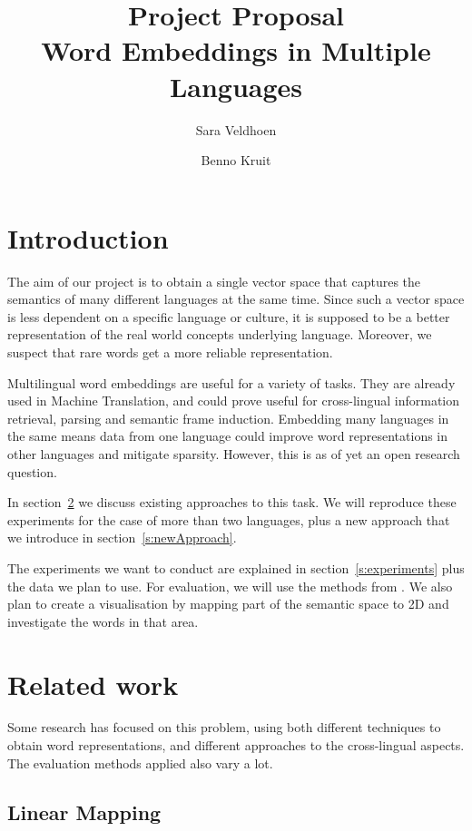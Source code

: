 \documentclass[twocolumn]{article}
\title{Project Proposal\\
Word Embeddings in Multiple Languages}
\author{Sara Veldhoen \and Benno Kruit}
\date{\vspace{-5ex}}
\begin{document}
\maketitle

\section{Introduction}
The aim of our project is to obtain a single vector space that captures the semantics of many different languages at the same time. Since such a vector space is less dependent on a specific language or culture, it is supposed to be a better representation of the real world concepts underlying language. Moreover, we suspect that rare words get a more reliable representation.

Multilingual word embeddings are useful for a variety of tasks. They are already used in Machine Translation, and could prove useful for cross-lingual information retrieval, parsing and semantic frame induction.
Embedding many languages in the same means data from one language could improve word representations in other languages and mitigate sparsity.
However, this is as of yet an open research question.


In section~\ref{s:relatedWork} we discuss existing approaches to this task. We will reproduce these experiments for the case of more than two languages, plus a new approach that we introduce in section~\ref{s:newApproach}.

The experiments we want to conduct are explained in section~\ref{s:experiments} plus the data we plan to use. For evaluation, we will use the methods from \cite{mikolov2013exploiting,klementiev2012inducing}. We also plan to create a visualisation by mapping part of the semantic space to 2D and investigate the words in that area.




\section{Related work}\label{s:relatedWork}
Some research has focused on this problem, using both different techniques to obtain word representations, and different approaches to the cross-lingual aspects. The evaluation methods applied also vary a lot.


\subsection{Linear Mapping}\label{s:lin}
\end{document}
